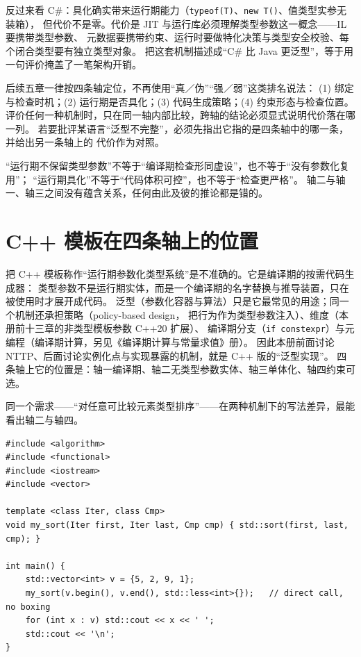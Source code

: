 \documentclass[12pt,a4paper,fontset=fandol]{ctexbook}
\newcommand{\cpplabel}{%
  \tcbox[on line,colback=cppheadbg,colframe=cppheadbg,
    boxrule=0pt,arc=1pt,left=2pt,right=2pt,top=1pt,bottom=1pt,
    colupper=white,fontupper=\scriptsize\bfseries]{C++}}
\newcommand{\cpp}[1]{C++#1}
\newcommand{\kw}[1]{\texttt{#1}}
\begin{document}
反过来看 C\#：具化确实带来运行期能力（\kw{typeof(T)}、\kw{new T()}、值类型实参无装箱），
但代价不是零。代价是 JIT 与运行库必须理解类型参数这一概念——IL 要携带类型参数、
元数据要携带约束、运行时要做特化决策与类型安全校验、每个闭合类型要有独立类型对象。
把这套机制描述成“C\# 比 Java 更泛型”，等于用一句评价掩盖了一笔架构开销。

\begin{guideline}[title={分类轴的口径}]
后续五章一律按四条轴定位，不再使用“真／伪”“强／弱”这类排名说法：
(1) 绑定与检查时机；(2) 运行期是否具化；(3) 代码生成策略；(4) 约束形态与检查位置。
评价任何一种机制时，只在同一轴内部比较，跨轴的结论必须显式说明代价落在哪一列。
若要批评某语言“泛型不完整”，必须先指出它指的是四条轴中的哪一条，并给出另一条轴上的
代价作为对照。
\end{guideline}

\begin{warning}[title={一句话禁令}]
“运行期不保留类型参数”不等于“编译期检查形同虚设”，也不等于“没有参数化复用”；
“运行期具化”不等于“代码体积可控”，也不等于“检查更严格”。
轴二与轴一、轴三之间没有蕴含关系，任何由此及彼的推论都是错的。
\end{warning}

\section{\texorpdfstring{\cpp{} 模板在四条轴上的位置}{C++ 模板在四条轴上的位置}}

把 \cpp{} 模板称作“运行期参数化类型系统”是不准确的。它是编译期的按需代码生成器：
类型参数不是运行期实体，而是一个编译期的名字替换与推导装置，只在被使用时才展开成代码。
泛型（参数化容器与算法）只是它最常见的用途；同一个机制还承担策略（policy-based design，
把行为作为类型参数注入）、维度（本册前十三章的非类型模板参数 \cpp{20} 扩展）、
编译期分支（\kw{if constexpr}）与元编程（编译期计算，另见《编译期计算与常量求值》册）。
因此本册前面讨论 NTTP、后面讨论实例化点与实现暴露的机制，就是 \cpp{} 版的“泛型实现”。
四条轴上它的位置是：轴一编译期、轴二无类型参数实体、轴三单体化、轴四约束可选。

同一个需求——“对任意可比较元素类型排序”——在两种机制下的写法差异，最能看出轴二与轴四。

\cpplabel
\begin{lstlisting}[style=cppstyle,caption={\cpp{}：类型参数在编译期被消耗，生成物里没有 \kw{T}}]
#include <algorithm>
#include <functional>
#include <iostream>
#include <vector>

template <class Iter, class Cmp>
void my_sort(Iter first, Iter last, Cmp cmp) { std::sort(first, last, cmp); }

int main() {
    std::vector<int> v = {5, 2, 9, 1};
    my_sort(v.begin(), v.end(), std::less<int>{});   // direct call, no boxing
    for (int x : v) std::cout << x << ' ';
    std::cout << '\n';
}
\end{lstlisting}
\end{document}
